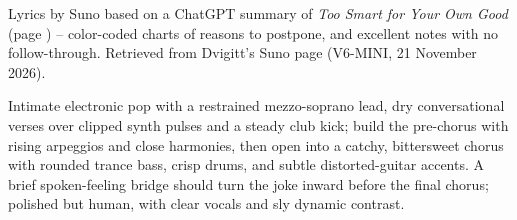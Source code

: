 
\begin{notes}
Lyrics by Suno based on a ChatGPT summary of \emph{Too Smart for Your Own Good} (page \pageref{sec:too-smart-for-your-own-good}) -- color-coded charts of reasons to postpone, and excellent notes with no follow-through. Retrieved from Dvigitt's Suno page (V6-MINI, 21 November 2026).
\end{notes}
\begin{style}
Intimate electronic pop with a restrained mezzo-soprano lead, dry conversational verses over clipped synth pulses and a steady club kick; build the pre-chorus with rising arpeggios and close harmonies, then open into a catchy, bittersweet chorus with rounded trance bass, crisp drums, and subtle distorted-guitar accents. A brief spoken-feeling bridge should turn the joke inward before the final chorus; polished but human, with clear vocals and sly dynamic contrast.
\end{style}
